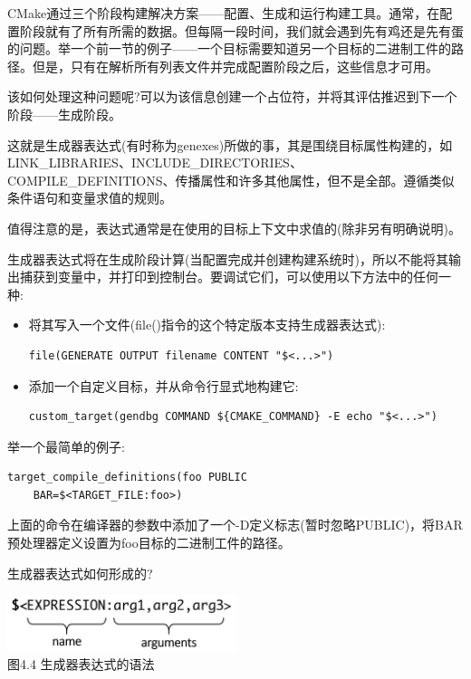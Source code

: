 
CMake通过三个阶段构建解决方案——配置、生成和运行构建工具。通常，在配置阶段就有了所有所需的数据。但每隔一段时间，我们就会遇到先有鸡还是先有蛋的问题。举一个前一节的例子——一个目标需要知道另一个目标的二进制工件的路径。但是，只有在解析所有列表文件并完成配置阶段之后，这些信息才可用。

该如何处理这种问题呢?可以为该信息创建一个占位符，并将其评估推迟到下一个阶段——生成阶段。

这就是生成器表达式(有时称为genexes)所做的事，其是围绕目标属性构建的，如LINK\_LIBRARIES、INCLUDE\_DIRECTORIES、COMPILE\_DEFINITIONS、传播属性和许多其他属性，但不是全部。遵循类似条件语句和变量求值的规则。

值得注意的是，表达式通常是在使用的目标上下文中求值的(除非另有明确说明)。

\begin{tcolorbox}[colback=blue!5!white,colframe=blue!75!black,title=重要的Note]
生成器表达式将在生成阶段计算(当配置完成并创建构建系统时)，所以不能将其输出捕获到变量中，并打印到控制台。要调试它们，可以使用以下方法中的任何一种:

\begin{itemize}
\item 
将其写入一个文件(file()指令的这个特定版本支持生成器表达式):
\begin{lstlisting}[style=styleCMake]
file(GENERATE OUTPUT filename CONTENT "$<...>")
\end{lstlisting}

\item 
添加一个自定义目标，并从命令行显式地构建它:
\begin{lstlisting}[style=styleCMake]
custom_target(gendbg COMMAND ${CMAKE_COMMAND} -E echo "$<...>")
\end{lstlisting}
\end{itemize}
\end{tcolorbox}


举一个最简单的例子:

\begin{lstlisting}[style=styleCMake]
target_compile_definitions(foo PUBLIC
	BAR=$<TARGET_FILE:foo>)
\end{lstlisting}

上面的命令在编译器的参数中添加了一个-D定义标志(暂时忽略PUBLIC)，将BAR预处理器定义设置为foo目标的二进制工件的路径。

生成器表达式如何形成的?

\begin{center}
\includegraphics[width=0.5\textwidth]{content/2/chapter4/images/4.jpg}\\
图4.4 生成器表达式的语法
\end{center}

